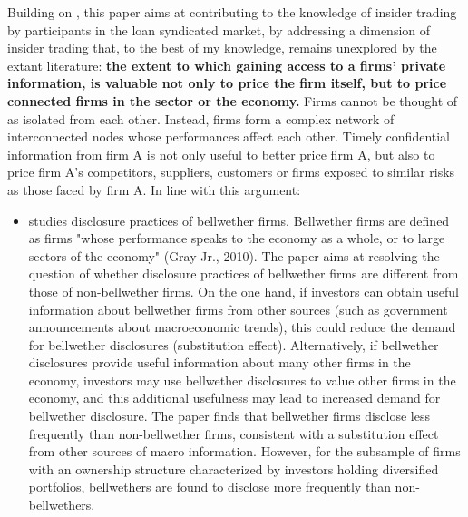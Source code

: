 \documentclass[english, 1p]{elsarticle}
\begin{document}
Building on \cite{Bushman2014}, this paper aims at contributing to the knowledge of insider trading by participants in the loan syndicated market, by addressing a dimension of insider trading that, to the best of my knowledge, remains unexplored by the extant literature: \textbf{the extent to which gaining access to a firms' private information, is valuable not only to price the firm itself, but to price connected firms in the sector or the economy.} 
Firms cannot be thought of as isolated from each other. Instead, firms form a complex network of interconnected nodes whose performances affect each other. Timely confidential information from firm A is not only useful to better price firm A, but also to price firm A's competitors, suppliers, customers or firms exposed to similar risks as those faced by firm A. In line with this argument:

\begin{itemize}
 \item \citep{Tseng2014w} studies disclosure practices of bellwether firms. Bellwether firms are defined as firms "whose performance speaks to the economy as a whole, or to large sectors of the economy" (Gray Jr., 2010). The paper aims at resolving the question of whether disclosure practices of bellwether firms are different from those of non-bellwether firms. On the one hand, if investors can obtain useful information about bellwether firms from other sources (such as government announcements about macroeconomic trends), this could reduce the demand for bellwether disclosures (substitution effect). Alternatively, if bellwether disclosures provide useful information about many other firms in the economy, investors may use bellwether disclosures to value other firms in the economy, and this additional usefulness may lead to increased demand for bellwether disclosure. The paper finds that bellwether firms disclose less frequently than non-bellwether firms, consistent with a substitution effect from other sources of macro information. However, for the subsample of firms with an ownership structure characterized by investors holding diversified portfolios, bellwethers are found to disclose more frequently than non-bellwethers. 
\end{itemize}
\end{document}
